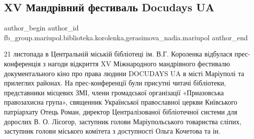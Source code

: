  
 
 
 
 

\subsection{XV Мандрівний фестиваль Docudays UA}
\label{sec:22_11_2018.fb.fb_group.mariupol.biblioteka.korolenka.1.xv_mandr_vnii_festiv}
 
\ifcmt
 author_begin
   author_id fb_group.mariupol.biblioteka.korolenka,gerasimova_nadia.mariupol
 author_end
\fi

21 листопада в Центральній міській бібліотеці ім. В.Г. Короленка відбулася
прес-конференція з нагоди відкриття XV Міжнародного мандрівного фестивалю
документального кіно про права людини DOCUDAYS UA в місті Маріуполі та
прилеглих районах. На прес-конференції були присутні читачі бібліотеки,
представники місцевих ЗМІ, члени громадської організації «Приазовська
правозахисна група», священник Української православної церкви Київського
патріархату Отець Роман, директор Централізованої бібліотечної системи для
дорослих  В. О. Лісогор, заступник голови Маріупольського товариства сліпих,
заступник голови міського комітета з доступності Ольга Кочетова та ін. 

